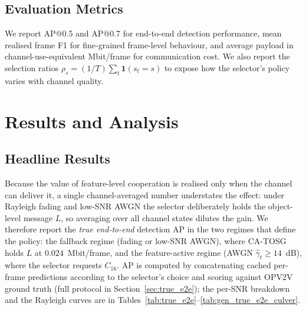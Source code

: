 \documentclass[journal]{IEEEtran}
\newcommand{\method}{CA-TOSG}
\begin{document}
\subsection{Evaluation Metrics}

We report AP@0.5 and AP@0.7 for end-to-end detection performance, mean realised frame F1 for fine-grained frame-level behaviour, and average payload in channel-use-equivalent Mbit/frame for communication cost. We also report the selection ratios $\rho_s = (1/T)\sum_t \mathbf{1}(s_t=s)$ to expose how the selector's policy varies with channel quality.

\section{Results and Analysis}

\subsection{Headline Results}\label{sec:headline}

Because the value of feature-level cooperation is realised only when the channel can deliver it, a single channel-averaged number understates the effect: under Rayleigh fading and low-SNR AWGN the selector deliberately holds the object-level message $L$, so averaging over all channel states dilutes the gain. We therefore report the \emph{true end-to-end} detection AP in the two regimes that define the policy: the fallback regime (fading or low-SNR AWGN), where \method{} holds $L$ at $0.024$~Mbit/frame, and the feature-active regime (AWGN $\hat\gamma_t \ge 14$~dB), where the selector requests $C_{16}$. AP is computed by concatenating cached per-frame predictions according to the selector's choice and scoring against OPV2V ground truth (full protocol in Section~\ref{sec:true_e2e}); the per-SNR breakdown and the Rayleigh curves are in Tables~\ref{tab:true_e2e}--\ref{tab:gen_true_e2e_culver}.
\end{document}
